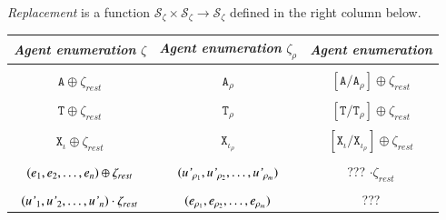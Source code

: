 \documentclass{elsarticle}
\begin{document}
\begin{definition}\label{replacement}
\emph{Replacement} is a function $\mathcal{S}_\zeta \times \mathcal{S}_\zeta \rightarrow \mathcal{S}_\zeta $ defined in the right column below.

\begin{center}
{\footnotesize
\begin{tabular}{ c c c }
	\emph{Agent enumeration} $\zeta$ & \emph{Agent enumeration} $\zeta_\rho$ & \emph{Agent enumeration} \\
	\hline
  	& \\[0.02cm]

  	$ \mathtt{A} \oplus \zeta_{rest} $ & $\mathtt{A}_\rho$ & $ [\mathtt{A} / \mathtt{A}_\rho] \oplus \zeta_{rest}  $\\

  	& \\[0.02cm]

  	$ \mathtt{T} \oplus \zeta_{rest} $ & $\mathtt{T}_\rho$ & $ [\mathtt{T} / \mathtt{T}_\rho] \oplus \zeta_{rest}  $\\

  	& \\[0.02cm]

  	$ \mathtt{X}_\iota \oplus \zeta_{rest} $ & $\mathtt{X}_{\iota_\rho}$ & $ [\mathtt{X}_\iota / \mathtt{X}_{\iota_\rho}] \oplus \zeta_{rest}  $\\

  	& \\[0.02cm]

  	$ (\emph{e}_1, \emph{e}_2, \ldots, \emph{e}_n) \oplus \zeta_{rest} $ & $ (\emph{u'}_{\rho_1}, \emph{u'}_{\rho_2}, \ldots, \emph{u'}_{\rho_m}) $ & ??? $ \cdot \zeta_{rest}$\\

  	& \\[0.02cm]

  	$ (\emph{u'}_1, \emph{u'}_2, \ldots, \emph{u'}_n) \cdot \zeta_{rest} $ & $(\emph{e}_{\rho_1}, \emph{e}_{\rho_2}, \ldots, \emph{e}_{\rho_m})$ & ??? \\

\end{tabular}}
\end{center}
\end{definition}

\end{document}
